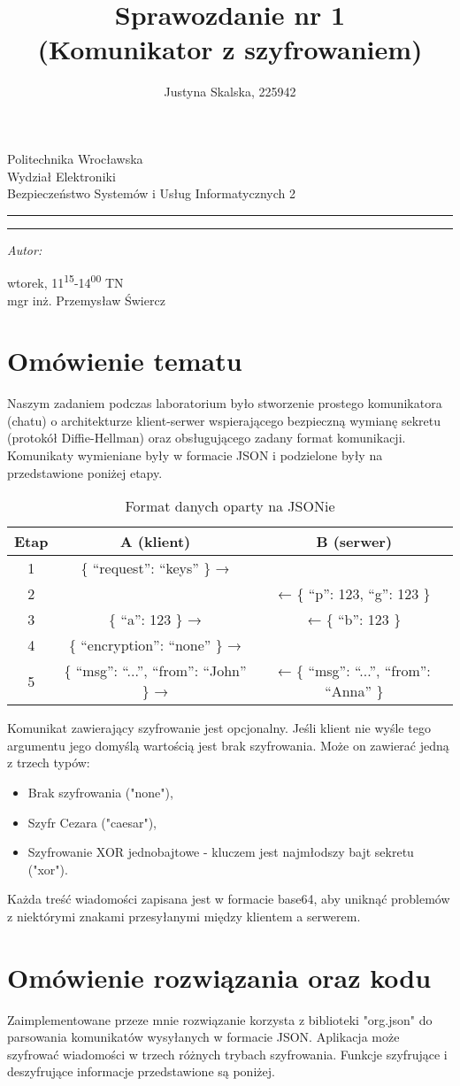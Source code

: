 \documentclass[12pt,a4paper,titlepage]{article}
\author{Justyna Skalska, 225942}
\title{Sprawozdanie nr 1\\
(Komunikator z szyfrowaniem)}
\makeatletter
\newcommand{\linia}{\rule{\linewidth}{0.4mm}}
\renewcommand{\maketitle}{\begin{titlepage}
    \vspace*{1cm}
    \begin{center}\small
    Politechnika Wrocławska\\
    Wydział Elektroniki\\
    Bezpieczeństwo Systemów i Usług Informatycznych 2
    \end{center}
    \vspace{3cm}
    \noindent\linia
    \begin{center}
      \LARGE \textsc{\@title}
         \end{center}
     \linia
    \vspace{0.5cm}
    \begin{flushright}
    \begin{minipage}{7cm}
    \textit{\small Autor:}\\
    \normalsize \textsc{\@author} \par
    \end{minipage}
    \vspace{5cm}

     {\small wtorek, 11\textsuperscript{15}-14\textsuperscript{00} TN}\\
        mgr inż. Przemysław Świercz
     \end{flushright}
    \vspace*{\stretch{6}}
    \begin{center}
    \@date
    \end{center}
  \end{titlepage}%
}
\makeatother
\begin{document}
\maketitle
\section{Omówienie tematu}
Naszym zadaniem podczas laboratorium było stworzenie prostego komunikatora (chatu) o architekturze klient-serwer wspierającego bezpieczną wymianę sekretu (protokół Diffie-Hellman) oraz obsługującego zadany format komunikacji.
Komunikaty wymieniane były w formacie JSON i podzielone były na przedstawione poniżej etapy.

\begin{table}[h!]
\caption{Format danych oparty na JSONie}
\begin{tabular}{|c|c|c|}
\hline
Etap & A (klient)                           & B (serwer) \\
\hline
1     & \{ “request”: “keys” \} →            & \\
\hline
2     &                                      & ← \{ “p”: 123, “g”: 123 \} \\
\hline
3     & \{ “a”: 123 \} →                     & ← \{ “b”: 123 \} \\
\hline
4     & \{ “encryption”: “none” \} →         & \\
\hline
5     & \{ “msg”: “...”, “from”: “John” \} → & ← \{ “msg”: “...”, “from”: “Anna” \} \\
\hline
\end{tabular}
\end{table}

Komunikat zawierający szyfrowanie jest opcjonalny. Jeśli klient nie wyśle tego argumentu jego domyślą wartością jest brak szyfrowania. Może on zawierać jedną z trzech typów:
\begin{itemize}
    \item Brak szyfrowania ("none"),
    \item Szyfr Cezara ("caesar"),
    \item Szyfrowanie XOR jednobajtowe - kluczem jest najmłodszy bajt sekretu ("xor").
\end{itemize}{}

Każda treść wiadomości zapisana jest w formacie base64, aby uniknąć problemów z niektórymi znakami przesyłanymi między klientem a serwerem.

\section{Omówienie rozwiązania oraz kodu}
Zaimplementowane przeze mnie rozwiązanie korzysta z biblioteki "org.json" do parsowania komunikatów wysyłanych w formacie JSON. Aplikacja może szyfrować wiadomości w trzech różnych trybach szyfrowania. Funkcje szyfrujące i deszyfrujące informacje przedstawione są poniżej.
\end{document}
